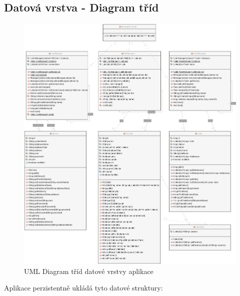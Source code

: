 \documentclass[czech,bachelor,public,dept460,male,cpdeclaration,twoside]{diploma}
\begin{document}
\subsection{Datová vrstva - Diagram tříd}
\begin{figure}[!htbp]\centering\includegraphics[width=1.0\textwidth]{Figures/DataLayerDiagram.png}\caption{UML Diagram tříd datové vrstvy aplikace}
\end{figure}
\newpage
Aplikace perzistentně ukládá tyto datové struktury:
\end{document}
